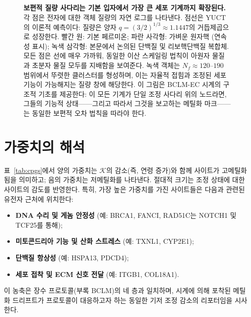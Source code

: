 \documentclass[12pt,a4paper]{article}
\newcommand{\REL}{\mathcal{K}}          %
\begin{document}
\begin{figure}[H]
		\caption{\textbf{보편적 질량 사다리는 기본 입자에서 가장 큰 세포 기계까지 확장된다.} 
			각 점은 전자에 대한 객체 질량의 자연 로그를 나타낸다.
			점선은 YUCT의 이론적 예측이다: 질량은 양자 \(q = (3/2)^{1/3} \approx 1.1447\)의 거듭제곱으로 성장한다.
			빨간 원: 기본 페르미온; 파란 사각형: 가벼운 원자핵 (연속성 표시); 녹색 삼각형: 본문에서 논의된 단백질 및 리보핵단백질 복합체.
			모든 점은 선에 매우 가까워, 동일한 이산 스케일링 법칙이 아원자 물질과 초분자 물질 모두를 지배함을 보여준다.
			녹색 객체는 \(N_f \approx 120\)--\(190\) 범위에서 뚜렷한 클러스터를 형성하며, 이는 자율적 접힘과 조정된 세포 기능이 가능해지는 질량 창에 해당한다.
			이 그림은 BCLM-EC 시계의 구조적 기초를 제공한다: 이 모든 기계가 단일 조정 사다리 위의 노드라면, 그들의 기능적 상태——그리고 따라서 그것을 보고하는 메틸화 마크——는 동일한 보편적 오차 법칙을 따라야 한다.}
		\label{fig:mass_ladder_bclm}
	\end{figure}
	
	\section{가중치의 해석}
	\label{sec:weights}
	표~\ref{tab:cpgs}에서 양의 가중치는 \(\REL\)의 감소(즉, 연령 증가)와 함께 사이트가 고메틸화됨을 의미하고; 음의 가중치는 저메틸화를 나타낸다. 절대적 크기는 조정 상태에 대한 사이트의 감도를 반영한다. 특히, 가장 높은 가중치를 가진 사이트들은 다음과 관련된 유전자 근처에 위치한다:
	\begin{itemize}
		\item \textbf{DNA 수리 및 게놈 안정성} (예: BRCA1, FANCI, RAD51C는 NOTCH1 및 TCF25를 통해);
		\item \textbf{미토콘드리아 기능 및 산화 스트레스} (예: TXNL1, CYP2E1);
		\item \textbf{단백질 항상성} (예: HSPA13, PDCD4);
		\item \textbf{세포 접착 및 ECM 신호 전달} (예: ITGB1, COL18A1).
	\end{itemize}
	이 농축은 장수 프로토콜(부록 BCLM)의 네 층과 일치하며, 시계에 의해 포착된 메틸화 드리프트가 프로토콜이 대응하고자 하는 동일한 기저 조정 감소의 리포터임을 시사한다.
	
\end{document}
